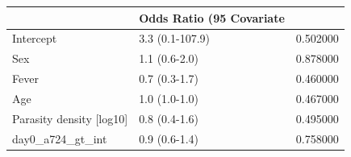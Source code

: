 \begin{tabular}{llr}
\toprule
 & Odds Ratio (95%
Covariate &  &  \\
\midrule
Intercept & 3.3 (0.1-107.9) & 0.502000 \\
Sex & 1.1 (0.6-2.0) & 0.878000 \\
Fever & 0.7 (0.3-1.7) & 0.460000 \\
Age & 1.0 (1.0-1.0) & 0.467000 \\
Parasity density [log10] & 0.8 (0.4-1.6) & 0.495000 \\
day0_a724_gt_int & 0.9 (0.6-1.4) & 0.758000 \\
\bottomrule
\end{tabular}
